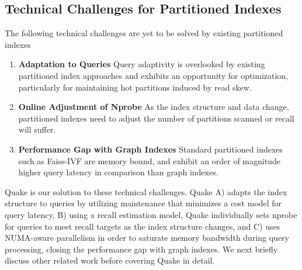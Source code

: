 \subsection{Technical Challenges for Partitioned Indexes}
The following technical challenges are yet to be solved by existing partitioned indexes
\begin{enumerate}[leftmargin=*, itemsep=-.25em, topsep=0pt]
    \item \textbf{Adaptation to Queries} Query adaptivity is overlooked by existing partitioned index approaches and exhibits an opportunity for optimization, particularly for maintaining hot partitions induced by read skew.
    \item \textbf{Online Adjustment of Nprobe} As the index structure and data change, partitioned indexes need to adjust the number of partitions scanned or recall will suffer. 
    \item \textbf{Performance Gap with Graph Indexes} Standard partitioned indexes such as Faiss-IVF are memory bound, and exhibit an order of magnitude higher query latency in comparison than graph indexes.
\end{enumerate}

Quake is our solution to these technical challenges. Quake A) adapts the index structure to queries by utilizing maintenance that minimizes a cost model for query latency, B) using a recall estimation model, Quake individually sets nprobe for queries to meet recall targets as the index structure changes, and C) uses NUMA-aware parallelism in order to saturate memory bandwidth during query processing, closing the performance gap with graph indexes. We next briefly discuss other related work before covering Quake in detail.
